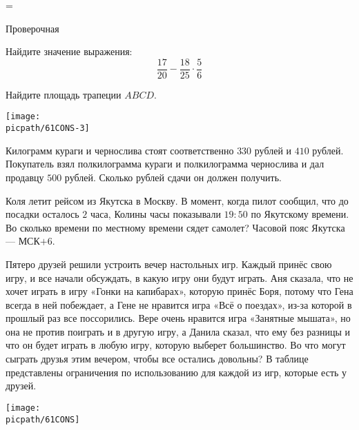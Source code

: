 =%
\begin{exam}
	\begin{listofex}
		\item Проверочная
	\end{listofex}
\end{exam}

\begin{consultation}
	\begin{listofex}
		\item Найдите значение выражения: \[ \dfrac{17}{20} - \dfrac{18}{25} \cdot \dfrac{5}{6} \]
		\item
		\begin{minipage}[t]{180pt}
			Найдите площадь трапеции \( ABCD \).
		\end{minipage}
		\hspace{0.01\linewidth}
		\begin{minipage}[t]{100pt}
			\texttt{[image: \\picpath/61CONS-3]}
		\end{minipage}
		
		\item Килограмм кураги и чернослива стоят соответственно \(330\) рублей и \(410\) рублей. Покупатель взял полкилограмма кураги и полкилограмма чернослива и дал продавцу \(500\) рублей. Сколько рублей сдачи он должен получить.
		\item Коля летит рейсом из Якутска в Москву. В момент, когда пилот сообщил, что до посадки осталось \(2\) часа, Колины часы показывали \(19:50\) по Якутскому времени. Во сколько времени по местному времени сядет самолет? Часовой пояс Якутска --- МСК\(+6\).
		\item
		\begin{minipage}[t]{160pt}
		Пятеро друзей решили устроить вечер настольных игр. Каждый принёс свою игру, и все начали обсуждать, в какую игру они будут играть. Аня сказала, что не хочет играть в игру «Гонки на капибарах», которую принёс Боря, потому что Гена всегда в ней побеждает, а Гене не нравится игра «Всё о поездах», из-за которой в прошлый раз все поссорились. Вере очень нравится игра «Занятные мышата», но она не против поиграть и в другую игру, а Данила сказал, что ему без разницы и что он будет играть в любую игру, которую выберет большинство. Во что могут сыграть друзья этим вечером, чтобы все остались довольны? В таблице представлены ограничения по использованию для каждой из игр, которые есть у друзей.
		\end{minipage}
		\hspace{0.01\linewidth}
		\begin{minipage}[t]{140pt}
			\texttt{[image: \\picpath/61CONS]}
		\end{minipage}
		

\end{listofex}
\end{consultation}
